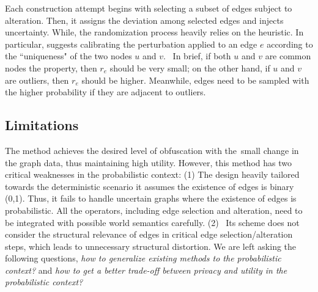Each construction attempt begins with selecting a subset of edges subject to alteration. 
Then, it assigns the deviation among selected edges and injects uncertainty. 
While, the randomization process heavily relies on the heuristic.  
In particular, {\soaName} suggests calibrating the perturbation applied to an edge $e$ according to the ``uniqueness" of the two nodes $u$ and $v$. 
In brief, if both $u$ and $v$ are common nodes {\wrt} the property, then $r_{e}$ should be very small; 
on the other hand, if $u$ and $v$ are outliers, then $r_{e}$ should be higher. 
Meanwhile, edges need to be sampled with the higher probability if they are adjacent to outliers. 

\subsection{Limitations} 
The {\soaName} method achieves the desired level of obfuscation with the small change in the graph data, thus maintaining high utility.
However, this method has two critical weaknesses in the probabilistic context:
(1) The design heavily tailored towards the deterministic scenario {\eg} it assumes the existence of edges is binary (0,1). Thus, it fails to handle uncertain graphs where the existence of edges is probabilistic. 
All the operators, including edge selection and alteration, need to be integrated with possible world semantics carefully.
(2)  Its scheme does not consider the structural relevance of edges in critical edge selection/alteration steps, which leads to unnecessary structural distortion.
We are left asking the following questions, \emph{how to generalize existing methods to the probabilistic context?} and \emph{how to get a better trade-off between privacy and utility in the probabilistic context?} 